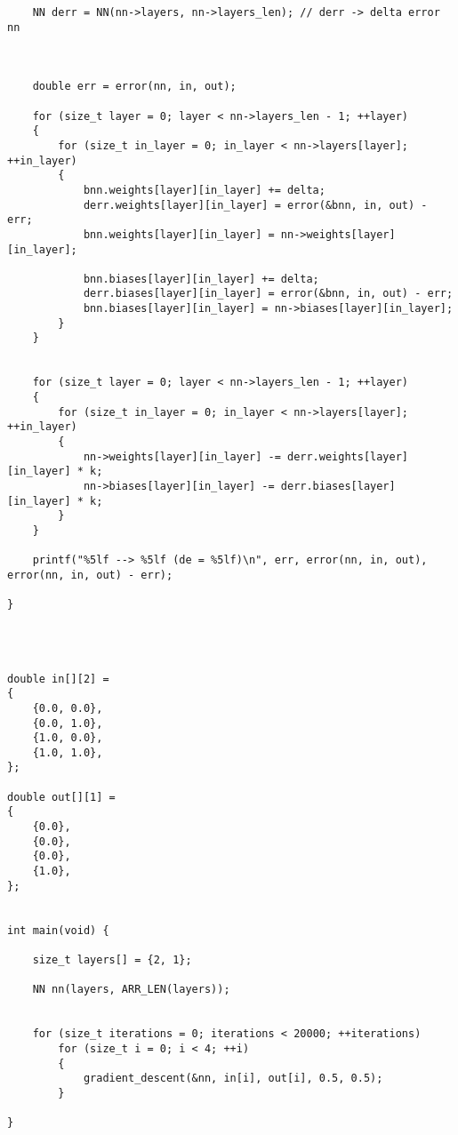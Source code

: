 \documentclass{article}
\begin{document}
\begin{lstlisting}
    NN derr = NN(nn->layers, nn->layers_len); // derr -> delta error nn



    double err = error(nn, in, out);

    for (size_t layer = 0; layer < nn->layers_len - 1; ++layer)
    {
        for (size_t in_layer = 0; in_layer < nn->layers[layer]; ++in_layer)
        {
            bnn.weights[layer][in_layer] += delta;
            derr.weights[layer][in_layer] = error(&bnn, in, out) - err;
            bnn.weights[layer][in_layer] = nn->weights[layer][in_layer];

            bnn.biases[layer][in_layer] += delta;
            derr.biases[layer][in_layer] = error(&bnn, in, out) - err;
            bnn.biases[layer][in_layer] = nn->biases[layer][in_layer];
        }
    }


    for (size_t layer = 0; layer < nn->layers_len - 1; ++layer)
    {
        for (size_t in_layer = 0; in_layer < nn->layers[layer]; ++in_layer)
        {
            nn->weights[layer][in_layer] -= derr.weights[layer][in_layer] * k;
            nn->biases[layer][in_layer] -= derr.biases[layer][in_layer] * k;
        }
    }

    printf("%5lf --> %5lf (de = %5lf)\n", err, error(nn, in, out), error(nn, in, out) - err);

}




double in[][2] = 
{
    {0.0, 0.0},
    {0.0, 1.0},
    {1.0, 0.0},
    {1.0, 1.0},
};

double out[][1] = 
{
    {0.0},
    {0.0},
    {0.0},
    {1.0},
};


int main(void) {

    size_t layers[] = {2, 1};

    NN nn(layers, ARR_LEN(layers));


    for (size_t iterations = 0; iterations < 20000; ++iterations)
        for (size_t i = 0; i < 4; ++i)
        {
            gradient_descent(&nn, in[i], out[i], 0.5, 0.5);
        }

}
        \end{lstlisting}
        
    
\end{document}
